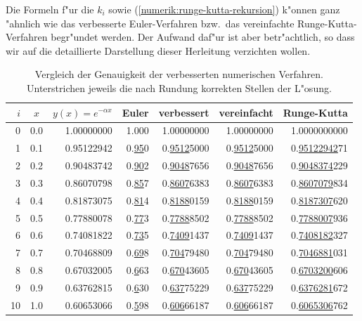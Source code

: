 Die Formeln f"ur die $k_i$ sowie (\ref{numerik:runge-kutta-rekursion})
k"onnen ganz "ahnlich wie das verbesserte Euler-Verfahren bzw.~das
vereinfachte Runge-Kutta-Verfahren begr"undet werden.
Der Aufwand daf"ur ist aber betr"achtlich, so dass wir auf die
detaillierte Darstellung dieser Herleitung verzichten wollen.

\begin{table}
\centering
\begin{tabular}{|r|c|r|r|r|r|r|}
\hline
$i$& $x$ & $y(x)=e^{-\alpha x}$&Euler&verbessert&vereinfacht&Runge-Kutta\\
\hline
 0 & 0.0 & 1.00000000 & 1.000 & 1.00000000 & 1.00000000 & 1.0000000000 \\
 1 & 0.1 & 0.95122942 & 0.\underline{95}0 & 0.\underline{9512}5000 & 0.\underline{9512}5000 & 0.\underline{95122942}71 \\
 2 & 0.2 & 0.90483742 & 0.\underline{90}2 & 0.\underline{9048}7656 & 0.\underline{9048}7656 & 0.\underline{9048374}229 \\
 3 & 0.3 & 0.86070798 & 0.\underline{85}7 & 0.\underline{8607}6383 & 0.\underline{8607}6383 & 0.\underline{8607079}834 \\
 4 & 0.4 & 0.81873075 & 0.\underline{81}4 & 0.\underline{8188}0159 & 0.\underline{8188}0159 & 0.\underline{8187307}620 \\
 5 & 0.5 & 0.77880078 & 0.\underline{77}3 & 0.\underline{7788}8502 & 0.\underline{7788}8502 & 0.\underline{7788007}936 \\
 6 & 0.6 & 0.74081822 & 0.\underline{73}5 & 0.\underline{7409}1437 & 0.\underline{7409}1437 & 0.\underline{7408182}327 \\
 7 & 0.7 & 0.70468809 & 0.\underline{69}8 & 0.\underline{704}79480 & 0.\underline{704}79480 & 0.\underline{7046881}031 \\
 8 & 0.8 & 0.67032005 & 0.\underline{6}63 & 0.\underline{670}43605 & 0.\underline{670}43605 & 0.\underline{6703200}606 \\
 9 & 0.9 & 0.63762815 & 0.\underline{6}30 & 0.\underline{637}75229 & 0.\underline{637}75229 & 0.\underline{6376281}672 \\
10 & 1.0 & 0.60653066 & 0.\underline{5}98 & 0.\underline{606}66187 & 0.\underline{606}66187 & 0.\underline{6065306}762 \\
\hline
\end{tabular}
\caption{Vergleich der Genauigkeit der verbesserten numerischen Verfahren.
Unterstrichen jeweils die nach Rundung korrekten Stellen der L"osung.
\label{numerik:genauigkeit}}
\end{table}



